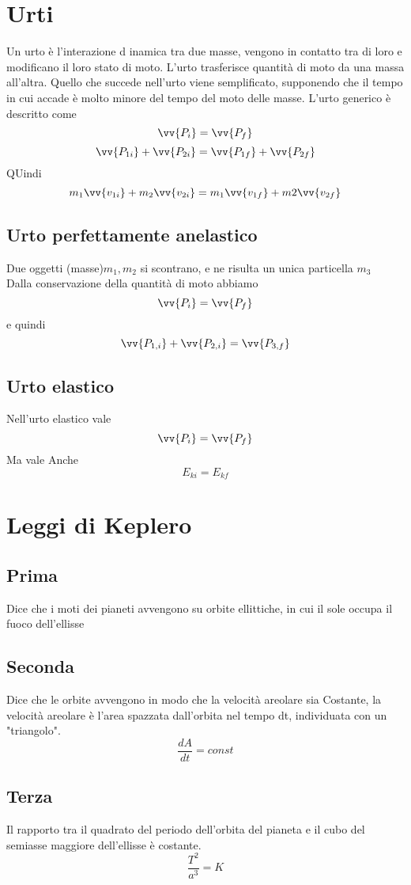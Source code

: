 \documentclass[a4paper]{report}
\begin{document}
  \section{Urti}
  Un urto è l'interazione d inamica tra due masse, vengono in contatto tra di loro e modificano il loro stato di moto.
  L'urto trasferisce quantità di moto da una massa all'altra. Quello che succede nell'urto viene semplificato, supponendo che il tempo in cui accade è molto minore del tempo del moto delle masse.
  L'urto generico è descritto come
  $$ \vv{P_i} = \vv{P_f}$$
  $$ \vv{P_{1i}} + \vv{P_{2i}} = \vv{P_{1f}} + \vv{P_{2f}}$$
  QUindi
  $$m_1 \vv{v_{1i}} + m_2 \vv{v_{2i}} = m_1 \vv{v_{1f}} + m2 \vv{v_{2f}}$$
  \subsection{Urto perfettamente anelastico}
  Due oggetti (masse)$m_1, m_2$ si scontrano, e ne risulta un unica particella $m_3$\\
  Dalla conservazione della quantità di moto abbiamo
  $$ \vv{P_i} = \vv{P_f} $$
  e quindi
  $$ \vv{P_{1,i}} + \vv{P_{2,i}} = \vv{P_{3,f}} $$

  \subsection{Urto elastico}
  Nell'urto elastico vale
  $$\vv{P_i} = \vv{P_f}$$
  Ma vale Anche
  $$E_{ki} = E_{kf}$$




  \section{Leggi di Keplero}
  \subsection{Prima}
  Dice che i moti dei pianeti avvengono su orbite ellittiche, in cui il sole occupa il fuoco dell'ellisse
  \subsection{Seconda}
  Dice che le orbite avvengono in modo che la velocità areolare sia Costante, la velocità areolare è l'area spazzata dall'orbita nel tempo dt, individuata con un "triangolo".
  $$ \frac{dA}{dt} = const$$
  \subsection{Terza}
  Il rapporto tra il quadrato del periodo dell'orbita del pianeta e il cubo del semiasse maggiore dell'ellisse è costante.
  $$ \frac{T^2}{a^3} = K $$
\end{document}
